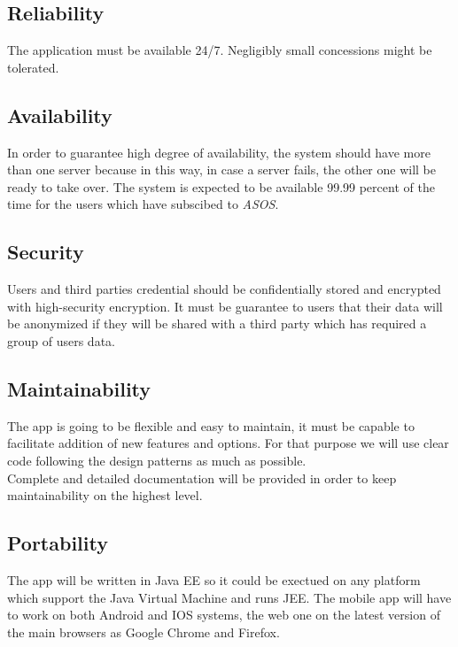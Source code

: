 \subsection{Reliability}
The application must be available 24/7. Negligibly small concessions might be tolerated.

\subsection{Availability}
In order to guarantee high degree of availability, the system should have more than one server because in this way, in case a server fails, the other one will be ready to take over. The system is expected to be available 99.99 percent of the time for the users which have subscibed to \textit{ASOS}.

\subsection{Security}
Users and third parties credential should be confidentially stored and encrypted with high-security encryption. It must be guarantee to users that their data will be anonymized if they will be shared with a third party which has required a group of users data.

\subsection{Maintainability}
The app is going to be flexible and easy to maintain, it must be capable to facilitate addition of new features and options. For that purpose we will use clear code following the design patterns as much as possible. \\
Complete and detailed documentation will be provided in order to keep maintainability on the highest level.

\subsection{Portability}
The app will be written in Java EE so it could be exectued on any platform which support the Java Virtual Machine and runs JEE. The mobile app will have to work on both Android and IOS systems, the web one on the latest version of the main browsers as Google Chrome and Firefox.